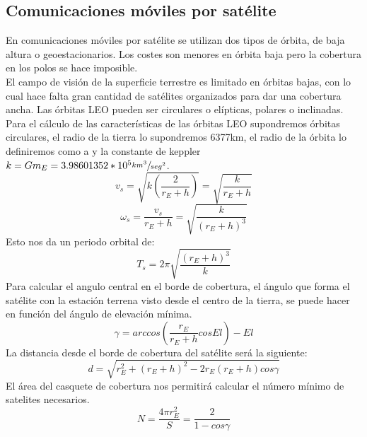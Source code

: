 	\subsection{Comunicaciones móviles por satélite}
	\label{sub:satMovil}
		En comunicaciones móviles por satélite se utilizan dos tipos de órbita, de baja altura o geoestacionarios. Los costes son menores en órbita baja pero la cobertura en los polos se hace imposible.\\
		El campo de visión de la superficie terrestre es limitado en órbitas bajas, con lo cual hace falta gran cantidad de satélites organizados para dar una cobertura ancha. Las órbitas LEO pueden ser circulares o elípticas, polares o inclinadas. Para el cálculo de las características de las órbitas LEO supondremos órbitas circulares, el radio de la tierra lo supondremos 6377km, el radio de la órbita lo definiremos como a y la constante de keppler $k=Gm_E=3.98601352*10^5\sfrac{km^3}{seg^2}$.
		\begin{equation}
			\tag{Velocidad lineal}
			v_s=\sqrt{k(\frac{2}{r_E+h})}=\sqrt{\frac{k}{r_E+h}}
		\end{equation}
		\begin{equation}
			\tag{Velocidad angular}
			\omega_s=\frac{v_s}{r_E+h}=\sqrt{\frac{k}{(r_E+h)^3}}
		\end{equation}
		Esto nos da un periodo orbital de:
		\begin{equation}
			\tag{Periodo orbital}
			T_s=2\pi\sqrt{\frac{(r_E+h)^3}{k}}
		\end{equation}
		Para calcular el angulo central en el borde de cobertura, el ángulo que forma el satélite con la estación terrena visto desde el centro de la tierra, se puede hacer en función del ángulo de elevación mínima.
		\begin{equation}
			\tag{Ángulo central}
			\gamma=arccos(\frac{r_E}{r_E+h}cosEl)-El
		\end{equation}
		La distancia desde el borde de cobertura del satélite será la siguiente:
		\begin{equation}
			\tag{Distancia al satélite}
			d=\sqrt{r_E^2+(r_E+h)^2-2r_E(r_E+h)cos\gamma}
		\end{equation}
		El área del casquete de cobertura nos permitirá calcular el número mínimo de satelites necesarios.
		\begin{equation}
			\tag{Número de satélites}
			N=\frac{4\pi r_E^2}{S}=\frac{2}{1-cos\gamma}
		\end{equation}
